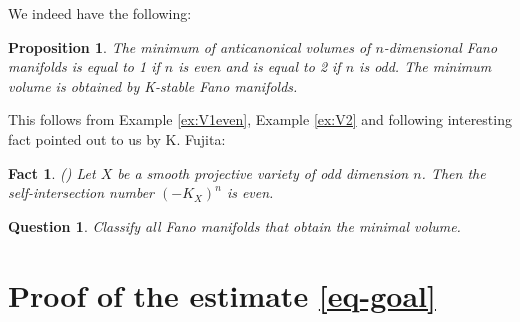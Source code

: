 \documentclass[12pt]{amsart}
\newtheorem{prop}[thm]{Proposition}
\newtheorem{ques}[thm]{Question}
\newtheorem{fact}{Fact}
\theoremstyle{definition}
\begin{document}
We indeed have the following:
\begin{prop}
    The minimum of anticanonical volumes of $n$-dimensional Fano manifolds is equal to 1 if $n$ is even and is equal to 2 if $n$ is odd. The minimum volume is obtained by K-stable Fano manifolds. 
\end{prop}
This follows from Example \ref{ex:V1even}, Example \ref{ex:V2} and following interesting fact pointed out to us by K. Fujita:

\begin{fact}\label{fact-vol}
    (\cite[Solution to Exercise 5.23, Page 217]{KSC04}) Let $X$ be a smooth projective variety of odd dimension $n$. Then the self-intersection number $(-K_X)^n$ is even. 
\end{fact}


\begin{ques}
   Classify all Fano manifolds that obtain the minimal volume.     
\end{ques}


\appendix
\section{Proof of the estimate \eqref{eq-goal}}
\end{document}
